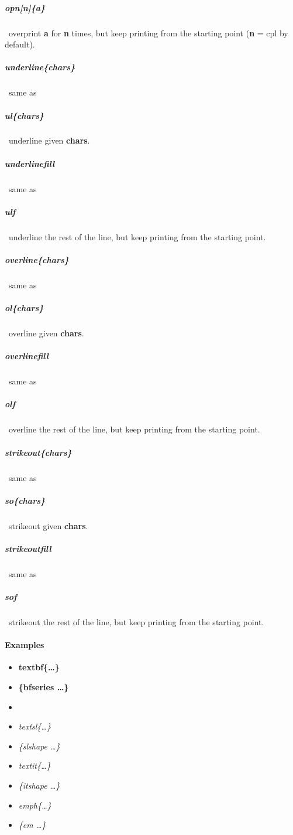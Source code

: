 \documentclass[english,12pt,openany,letterpaper]{book}
\begin{document}
\subparagraph{\tabspace\bs opn[n]\{a\}} \dash\ overprint \textbf{a} for \textbf{n} times, but keep printing from the starting point (\textbf{n} = \bs cpl by default).

\skipline

\subparagraph{\bs underline\{chars\}} \dash\ same as

\subparagraph{\tabspace\bs ul\{chars\}} \dash\ underline given \textbf{chars}.

\subparagraph{\bs underlinefill} \dash\ same as

\subparagraph{\tabspace\bs ulf} \dash\ underline the rest of the line, but keep printing from the starting point.

\skipline

\subparagraph{\bs overline\{chars\}} \dash\ same as

\subparagraph{\tabspace\bs ol\{chars\}} \dash\ overline given \textbf{chars}.

\subparagraph{\bs overlinefill} \dash\ same as

\subparagraph{\tabspace\bs olf} \dash\ overline the rest of the line, but keep printing from the starting point.

\skipline

\subparagraph{\bs strikeout\{chars\}} \dash\ same as

\subparagraph{\tabspace\bs so\{chars\}} \dash\ strikeout given \textbf{chars}.

\subparagraph{\bs strikeoutfill} \dash\ same as

\subparagraph{\tabspace\bs sof} \dash\ strikeout the rest of the line, but keep printing from the starting point.

\break

\paragraph{Examples}

\vspace*{-2ex}

\begin{multicols}{3}
\begin{itemize}
	\item \textbf{\bs textbf\{\ldots\}}
	\item {\bfseries \{\bs bfseries \ldots\}}
	\item {}
	\item \textsl{\bs textsl\{\ldots\}}
	\item {\slshape \{\bs slshape \ldots\}}
	\item \textit{\bs textit\{\ldots\}}
	\item {\itshape \{\bs itshape \ldots\}}
	\item \emph{\bs emph\{\ldots\}}
	\item {\em \{\bs em \ldots\}}
\end{itemize}
\end{multicols}
\end{document}
